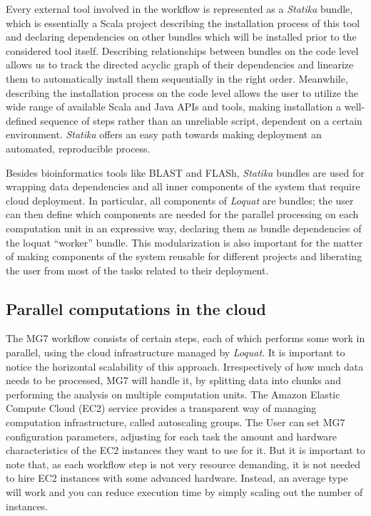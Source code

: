 \documentclass[fontsize=8pt,paper=a4,pagesize,abstracton]{scrartcl}
\begin{document}
Every external tool involved in the workflow is represented as a
\emph{Statika} bundle, which is essentially a Scala project describing
the installation process of this tool and declaring dependencies on
other bundles which will be installed prior to the considered tool
itself. Describing relationships between bundles on the code level
allows us to track the directed acyclic graph of their dependencies and
linearize them to automatically install them sequentially in the right
order. Meanwhile, describing the installation process on the code level
allows the user to utilize the wide range of available Scala and Java
APIs and tools, making installation a well-defined sequence of steps
rather than an unreliable script, dependent on a certain environment.
\emph{Statika} offers an easy path towards making deployment an
automated, reproducible process.

Besides bioinformatics tools like BLAST and FLASh, \emph{Statika}
bundles are used for wrapping data dependencies and all inner components
of the system that require cloud deployment. In particular, all
components of \emph{Loquat} are bundles; the user can then define which
components are needed for the parallel processing on each computation
unit in an expressive way, declaring them as bundle dependencies of the
loquat ``worker'' bundle. This modularization is also important for the
matter of making components of the system reusable for different
projects and liberating the user from most of the tasks related to their
deployment.

\subsection{Parallel computations in the
cloud}\label{parallel-computations-in-the-cloud}

The MG7 workflow consists of certain steps, each of which performs some
work in parallel, using the cloud infrastructure managed by
\emph{Loquat}. It is important to notice the horizontal scalability of
this approach. Irrespectively of how much data needs to be processed,
MG7 will handle it, by splitting data into chunks and performing the
analysis on multiple computation units. The Amazon Elastic Compute Cloud
(EC2) service provides a transparent way of managing computation
infrastructure, called autoscaling groups. The User can set MG7
configuration parameters, adjusting for each task the amount and
hardware characteristics of the EC2 instances they want to use for it.
But it is important to note that, as each workflow step is not very
resource demanding, it is not needed to hire EC2 instances with some
advanced hardware. Instead, an average type will work and you can reduce
execution time by simply scaling out the number of instances.
\end{document}
